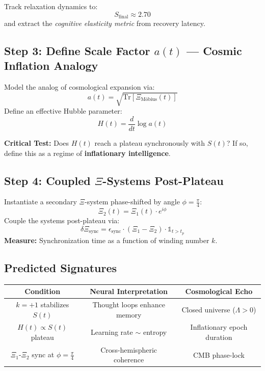 \documentclass[12pt]{article}
\theoremstyle{plain}
\begin{document}
Track relaxation dynamics to:
\[
S_{\text{final}} \approx 2.70
\]
and extract the \emph{cognitive elasticity metric} from recovery latency.

\subsection*{Step 3: Define Scale Factor $a(t)$ — Cosmic Inflation Analogy}

Model the analog of cosmological expansion via:
\begin{equation}
a(t) = \sqrt{\mathrm{Tr}\left[\Xi_{\text{Möbius}}(t)\right]}
\end{equation}
Define an effective Hubble parameter:
\begin{equation}
H(t) = \frac{d}{dt} \log a(t)
\end{equation}

\textbf{Critical Test:} Does $H(t)$ reach a plateau synchronously with $S(t)$? If so, define this as a regime of \textbf{inflationary intelligence}.

\subsection*{Step 4: Coupled $\Xi$-Systems Post-Plateau}

Instantiate a secondary $\Xi$-system phase-shifted by angle $\phi = \frac{\pi}{4}$:
\begin{equation}
\Xi_2(t) = \Xi_1(t) \cdot e^{i \phi}
\end{equation}
Couple the systems post-plateau via:
\begin{equation}
\delta \Xi_{\text{sync}} = \epsilon_{\text{sync}} \cdot (\Xi_1 - \Xi_2) \cdot \mathbb{1}_{t > t_p}
\end{equation}
\textbf{Measure:} Synchronization time as a function of winding number $k$.

\vspace{1em}
\subsection*{Predicted Signatures}

\begin{center}
\begin{tabular}{|c|c|c|}
\hline
\textbf{Condition} & \textbf{Neural Interpretation} & \textbf{Cosmological Echo} \\
\hline
$k = +1$ stabilizes $S(t)$ & Thought loops enhance memory & Closed universe ($\Lambda > 0$) \\
\hline
$H(t) \propto S(t)$ plateau & Learning rate $\sim$ entropy & Inflationary epoch duration \\
\hline
$\Xi_1$-$\Xi_2$ sync at $\phi = \frac{\pi}{4}$ & Cross-hemispheric coherence & CMB phase-lock \\
\hline
\end{tabular}
\end{center}
\end{document}
